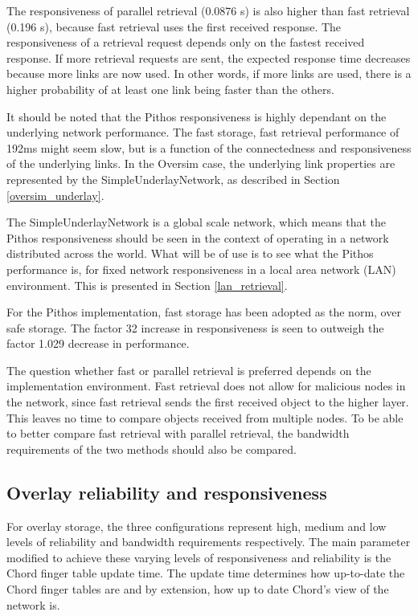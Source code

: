 The responsiveness of parallel retrieval (0.0876 s) is also higher than fast retrieval (0.196 s), because fast retrieval uses the first received response. The responsiveness of a retrieval request depends only on the fastest received response. If more retrieval requests are sent, the expected response time decreases because more links are now used. In other words, if more links are used, there is a higher probability of at least one link being faster than the others.

It should be noted that the Pithos responsiveness is highly dependant on the underlying network performance. The fast storage, fast retrieval performance of 192ms might seem slow, but is a function of the connectedness and responsiveness of the underlying links. In the Oversim case, the underlying link properties are represented by the SimpleUnderlayNetwork, as described in Section \ref{oversim_underlay}.

The SimpleUnderlayNetwork is a global scale network, which means that the Pithos responsiveness should be seen in the context of operating in a network distributed across the world. What will be of use is to see what the Pithos performance is, for fixed network responsiveness in a local area network (LAN) environment. This is presented in Section \ref{lan_retrieval}.

For the Pithos implementation, fast storage has been adopted as the norm, over safe storage. The factor 32 increase in responsiveness is seen to outweigh the factor 1.029 decrease in performance.

The question whether fast or parallel retrieval is preferred depends on the implementation environment. Fast retrieval does not allow for malicious nodes in the network, since fast retrieval sends the first received object to the higher layer. This leaves no time to compare objects received from multiple nodes. To be able to better compare fast retrieval with parallel retrieval, the bandwidth requirements of the two methods should also be compared.

\subsection{Overlay reliability and responsiveness}
\label{overlay_resp_rel_results}

For overlay storage, the three configurations represent high, medium and low levels of reliability and bandwidth requirements respectively. The main parameter modified to achieve these varying levels of responsiveness and reliability is the Chord finger table update time. The update time determines how up-to-date the Chord finger tables are and by extension, how up to date Chord's view of the network is.

